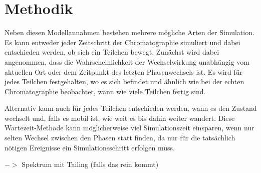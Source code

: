 \documentclass[a4paper,10pt]{article}
\begin{document}
\section{Methodik}
Neben diesen Modellannahmen bestehen mehrere mögliche Arten der Simulation. Es kann entweder jeder Zeitschritt der Chromatographie simuliert und dabei entschieden werden, ob sich ein Teilchen bewegt. Zunächst wird dabei angenommen, dass die Wahrscheinlichkeit der Wechselwirkung unabhängig vom aktuellen Ort oder dem Zeitpunkt des letzten Phasenwechsels ist. Es wird für jedes Teilchen festgehalten, wo es sich befindet und ähnlich wie bei der echten Chromatographie beobachtet, wann wie viele Teilchen fertig sind. 

Alternativ kann auch für jedes Teilchen entschieden werden, wann es den Zustand wechselt und, falls es mobil ist, wie weit es bis dahin weiter wandert. Diese Wartezeit-Methode kann möglicherweise viel Simulationszeit einsparen, wenn nur selten Wechsel zwischen den Phasen statt finden, da nur für die tatsächlich nötigen Ereignisse ein Simulationsschritt erfolgen muss.







$->$ Spektrum mit Tailing (falls das rein kommt)
\end{document}
